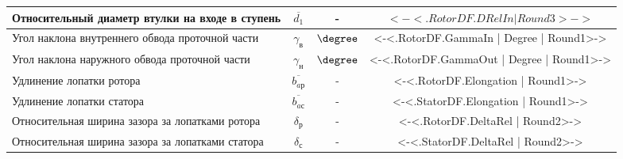 \begin{center}
\begin{longtable}{|p{7cm}|c|c|c|}
		Относительный диаметр втулки на входе в ступень & $\overline{d_1}$ & - & $<-<.RotorDF.DRelIn | Round3>->$ \\ \hline
		Угол наклона внутреннего обвода проточной части & $\gamma_{в}$ & $\degree$ & <-<.RotorDF.GammaIn | Degree | Round1>-> \\ \hline
		Угол наклона наружного обвода проточной части & $\gamma_{н}$ & $\degree$ & <-<.RotorDF.GammaOut | Degree | Round1>-> \\ \hline
		Удлинение лопатки ротора & $\overline{b_{aр}}$ & - & <-<.RotorDF.Elongation | Round1>-> \\ \hline
		Удлинение лопатки статора & $\overline{b_{aс}}$ & - & <-<.StatorDF.Elongation | Round1>-> \\ \hline
		Относительная ширина зазора за лопатками ротора & $\delta_р$ & - & <-<.RotorDF.DeltaRel | Round2>-> \\ \hline
		Относительная ширина зазора за лопатками статора & $\delta_с$ & - & <-<.StatorDF.DeltaRel | Round2>-> \\ \hline
	\end{longtable}
\end{center}


